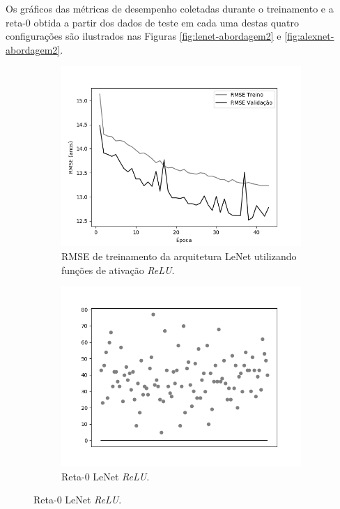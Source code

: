 	Os gráficos das métricas de desempenho coletadas durante o treinamento e a reta-0 obtida a partir dos dados de teste em cada uma destas quatro configurações são ilustrados nas Figuras \ref{fig:lenet-abordagem2} e \ref{fig:alexnet-abordagem2}.

	\begin{figure}[h!]
		\caption{Resultados do treinamento e teste da CNN LeNet.}\label{fig:lenet-abordagem2}
		\begin{subfigure}[hb]{0.5\linewidth}
			\caption{RMSE de treinamento da arquitetura LeNet utilizando funções de ativação \emph{ReLU}.}
			\includegraphics[width=\linewidth]{img/graficos/history/lenet/fig-history-image-treat-2-lenet-relu-rmse.png}%
		\end{subfigure}%
		\begin{subfigure}[hb]{0.5\linewidth}
			\caption{Reta-0 LeNet \emph{ReLU}.}
			\includegraphics[width=\linewidth]{img/graficos/reta0/lenet/fig-reta-0-image-treat-2-lenet-relu.png}%

\end{subfigure}
\end{figure}

